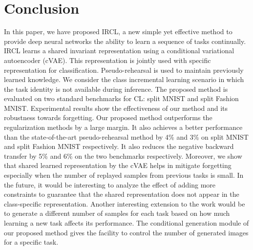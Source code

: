 \documentclass[letterpaper]{article} %
\begin{document}
\section{Conclusion}
In this paper, we have proposed IRCL, a new simple yet effective method to provide deep neural networks the ability to learn a sequence of tasks continually. IRCL learns a shared invariant representation using a conditional variational autoencoder (cVAE). This representation is jointly used with specific representation for classification. Pseudo-rehearsal is used to maintain previously learned knowledge. We consider the class incremental learning scenario in which the task identity is not available during inference. The proposed method is evaluated on two standard benchmarks for CL: split MNIST and split Fashion MNIST. Experimental results show the effectiveness of our method and its robustness towards forgetting. Our proposed method outperforms the regularization methods by a large margin. It also achieves a better performance than the state-of-the-art pseudo-rehearsal method by 4\% and 3\% on split MNIST and split Fashion MNIST respectively. It also reduces the negative backward transfer by 5\%  and 6\% on the two benchmarks respectively.
Moreover, we show that shared learned representation by the cVAE helps in mitigate forgetting especially when the number of replayed samples from previous tasks is small.  In the future, it would be interesting to analyze the effect of adding more constraints to guarantee that the shared representation does not appear in the class-specific representation. Another interesting extension to the work would be to generate a different number of samples for each task based on how much learning a new task affects its performance. The conditional generation module of our proposed method gives the facility to control the number of generated images for a specific task.
\end{document}
